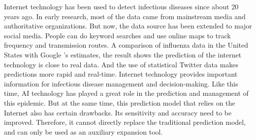 \documentclass[12pt,english]{article}
\begin{document}
\cite{baud2020real}
\newline
Internet technology has been used to detect infectious diseases since about 20 years ago. In early research, most of the data came from mainstream media and authoritative organizations. But now, the data source has been extended to major social media. 
People can do keyword searches and use online maps to track frequency and transmission routes. A comparison of influenza data in the United States with Google ’s estimates, the result shows the prediction of the internet technology is close to real data. 
And the use of statistical Twitter data makes predictions more rapid and real-time. 
Internet technology provides important information for infectious disease management and decision-making. Like this time, AI technology has played a great role in the prediction and management of this epidemic.
But at the same time, this prediction model that relies on the Internet also has certain drawbacks. Its sensitivity and accuracy need to be improved. Therefore, it cannot directly replace the traditional prediction model, and can only be used as an auxiliary expansion tool.
\cite{wu2020open}
\newline
\end{document}
